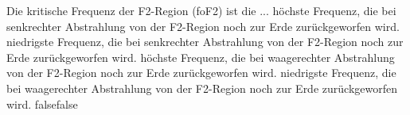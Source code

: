     {Die kritische Frequenz der F2-Region (foF2) ist die ...}
    {höchste Frequenz, die bei senkrechter Abstrahlung von der F2-Region noch zur Erde zurückgeworfen wird.}
    {niedrigste Frequenz, die bei senkrechter Abstrahlung von der F2-Region noch zur Erde zurückgeworfen wird.}
    {höchste Frequenz, die bei waagerechter Abstrahlung von der F2-Region noch zur Erde zurückgeworfen wird.}
    {niedrigste Frequenz, die bei waagerechter Abstrahlung von der F2-Region noch zur Erde zurückgeworfen wird.}
    {false}{false}